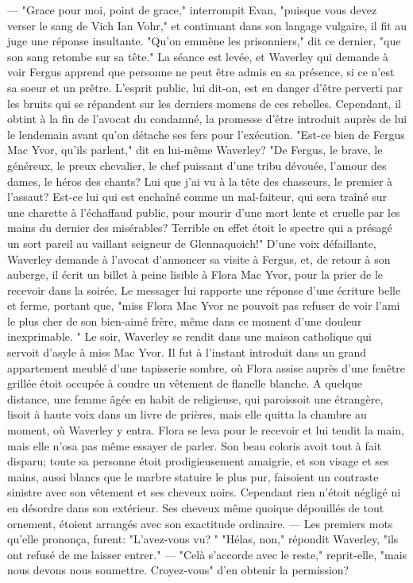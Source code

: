 {— "Grace pour moi, point de grace," interrompit Evan, "puisque vous devez verser le sang de Vich Ian Vohr," et continuant dans son langage vulgaire, il fit au juge une réponse insultante.
"Qu’on emmène les prisonniers," dit ce dernier, "que son sang retombe sur sa tête."
La séance est levée, et Waverley qui demande à voir Fergus apprend que personne ne peut être admis en sa présence, si ce n’est sa soeur et un prêtre. L’esprit public, lui dit-on, est en danger d’être perverti par les bruits qui se répandent sur les derniers\setcounter{page}{377} momens de ces rebelles. Cependant, il obtint à la fin de l’avocat du condamné, la promesse d’être introduit auprès de lui le lendemain avant qu’on détache ses fers pour l’exécution.
"Est-ce bien de Fergus Mac Yvor, qu’ils parlent," dit en lui-même Waverley? "De Fergus, le brave, le généreux, le preux chevalier, le chef puissant d’une tribu dévouée, l’amour des dames, le héros des chants? Lui que j’ai vu à la tête des chasseurs, le premier à l’assaut? Est-ce lui qui est enchaîné comme un mal-faiteur, qui sera traîné sur une charette à l’échaffaud public, pour mourir d’une mort lente et cruelle par les mains du dernier des misérables? Terrible en effet étoit le spectre qui a présagé un sort pareil au vaillant seigneur de Glennaquoich!"
D’une voix défaillante, Waverley demande à l’avocat d’annoncer sa visite à Fergus, et, de retour à son auberge, il écrit un billet à peine lisible à Flora Mac Yvor, pour la prier de le recevoir dans la soirée. Le messager lui rapporte une réponse d’une écriture belle et ferme, portant que, "miss Flora Mac Yvor ne pouvoit pas refuser de
\setcounter{page}{378} voir l'ami le plus cher de son bien-aimé frère, même dans ce moment d'une douleur inexprimable. "
Le soir, Waverley se rendit dans une maison catholique qui servoit d'asyle à miss Mac Yvor. Il fut à l'instant introduit dans un grand appartement meublé d'une tapisserie sombre, où Flora assise auprès d'une fenêtre grillée étoit occupée à coudre un vêtement de flanelle blanche. A quelque distance, une femme âgée en habit de religieuse, qui paroissoit une étrangère, lisoit à haute voix dans un livre de prières, mais elle quitta la chambre au moment, où Waverley y entra. Flora se leva pour le recevoir et lui tendit la main, mais elle n'osa pas même essayer de parler. Son beau coloris avoit tout à fait disparu; toute sa personne étoit prodigieusement amaigrie, et son visage et ses mains, aussi blancs que le marbre statuire le plus pur, faisoient un contraste sinistre avec son vêtement et ses cheveux noirs. Cependant rien n'étoit négligé ni en désordre dans son extérieur. Ses cheveux même quoique dépouillés de tout ornement, étoient arrangés avec son exactitude ordinaire. — Les premiers mots qu'elle prononça, furent: "L'avez-vous vu? "\setcounter{page}{379} "Hélas, non," répondit Waverley, "ils ont refusé de me laisser entrer." — "Celà s'accorde avec le reste," reprit-elle, "mais nous devons nous soumettre. Croyez-vous" d'en obtenir la permission?
}
